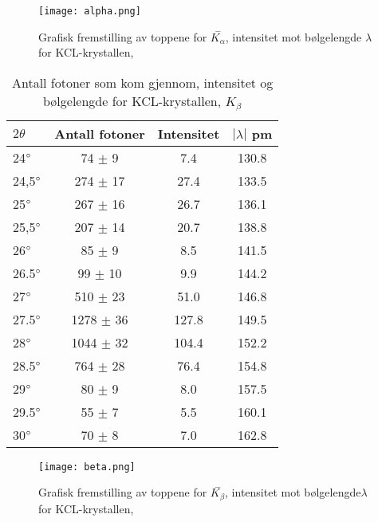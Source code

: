 \documentclass[norsk,a4paper,12pt]{article}
\begin{document}
\begin{figure}
	\begin{center}
  	\texttt{[image: alpha.png]}\\
	\caption[Topper for $K_\alpha$]{Grafisk fremstilling av toppene for $\overset{-}{K_\alpha}$, intensitet mot bølgelengde $\lambda$ for KCL-krystallen,}
	\label{topa}
	\end{center}
\end{figure}

\begin{table}
\centering
\caption[$K_\beta$]{Antall fotoner som kom gjennom, intensitet og bølgelengde for KCL-krystallen, $K_\beta$ }
	\begin{tabular}{|l|c|c|c|}
	\hline
	$2\theta$ & Antall fotoner & Intensitet & $|\lambda |$ pm\\ 
	\hline
	24$\degree$ & 74 $\pm$ 9 & 7.4 & 130.8 \\
	24,5$\degree$ & 274 $\pm$ 17 & 27.4 & 133.5 \\
	25$\degree$ & 267 $\pm$ 16 & 26.7 & 136.1 \\
	25,5$\degree$ & 207 $\pm$ 14 & 20.7 & 138.8 \\ 
	26$\degree$ & 85 $\pm$ 9 &  8.5 & 141.5 \\
	26.5$\degree$ & 99 $\pm$ 10 & 9.9 & 144.2 \\
	27$\degree$ & 510 $\pm$ 23 & 51.0 & 146.8 \\
	27.5$\degree$ & 1278 $\pm$ 36 & 127.8 & 149.5 \\
	28$\degree$ & 1044 $\pm$ 32 & 104.4 & 152.2 \\
	28.5$\degree$ & 764 $\pm$ 28 & 76.4 & 154.8 \\
	29$\degree$ & 80 $\pm$ 9 & 8.0 & 157.5 \\
	29.5$\degree$ & 55 $\pm$ 7 & 5.5 & 160.1 \\
	30$\degree$ & 70 $\pm$ 8 & 7.0 & 162.8 \\
	\hline
	\end{tabular}
\label{alpha}
\end{table}

\begin{figure}
	\begin{center}
  	\texttt{[image: beta.png]}\\
	\caption[Topper for $K_\beta$]{Grafisk fremstilling av toppene for $\overset{-}{K_\beta}$, intensitet mot bølgelengde$\lambda$ for KCL-krystallen,}
	\label{topb}
	\end{center}
\end{figure}
\end{document}

